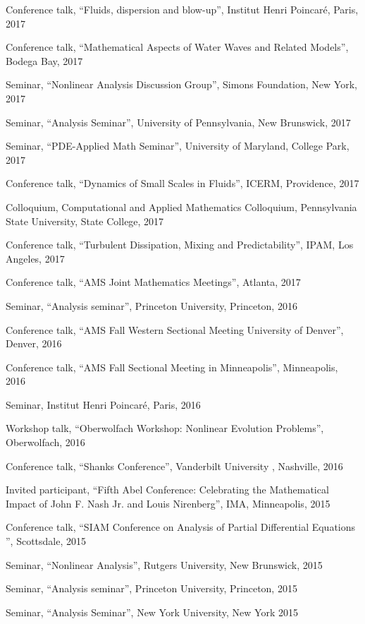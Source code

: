 \documentclass[10pt]{article}
\begin{document}
\begin{list}{}{\leftmargin=1em}
\item Conference talk, ``Fluids, dispersion and blow-up'', Institut Henri Poincar\'e, Paris, 2017
\item Conference talk, ``Mathematical Aspects of Water Waves and Related Models'',  Bodega Bay, 2017
\item Seminar, ``Nonlinear Analysis Discussion Group'', Simons Foundation,  New York, 2017
\item Seminar, ``Analysis Seminar'', University of Pennsylvania,  New Brunswick, 2017
\item Seminar, ``PDE-Applied Math Seminar'', University of Maryland,  College Park, 2017
\item Conference talk, ``Dynamics of Small Scales in Fluids'', ICERM, Providence, 2017
\item Colloquium, Computational and Applied Mathematics Colloquium, Pennsylvania State University, State College, 2017
\item Conference talk, ``Turbulent Dissipation, Mixing and Predictability'', IPAM, Los Angeles, 2017
\item Conference talk, ``AMS Joint Mathematics Meetings'', Atlanta, 2017
\item Seminar, ``Analysis seminar'',  Princeton University,  Princeton, 2016
\item Conference talk, ``AMS Fall Western Sectional Meeting University of Denver'', Denver, 2016
\item Conference talk, ``AMS Fall Sectional Meeting in Minneapolis'', Minneapolis, 2016
\item Seminar, Institut Henri Poincar\'e, Paris, 2016
\item Workshop talk, ``Oberwolfach Workshop: Nonlinear Evolution Problems'', Oberwolfach, 2016
\item Conference talk, ``Shanks Conference'', Vanderbilt University                           
, Nashville, 2016
\item Invited participant, ``Fifth Abel Conference: Celebrating the Mathematical Impact of John F. Nash Jr. and Louis Nirenberg'', IMA, Minneapolis, 2015 
\item Conference talk, ``SIAM Conference on Analysis of Partial Differential Equations '',  Scottsdale, 2015
\item Seminar, ``Nonlinear Analysis'', Rutgers University,  New Brunswick, 2015
\item Seminar, ``Analysis seminar'',  Princeton University,  Princeton, 2015
\item Seminar, ``Analysis Seminar'', New York University, New York 2015

\end{list}
\end{document}

